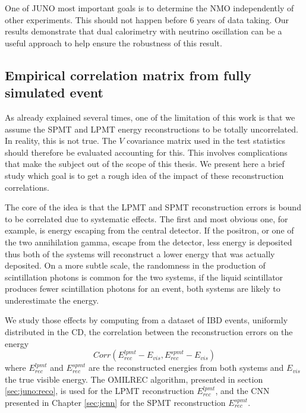 \documentclass[../main.tex]{subfiles}
\begin{document}
One of JUNO most important goals is to determine the NMO independently of other experiments. This should not happen before 6 years of data taking. Our results demonstrate that dual calorimetry with neutrino oscillation can be a useful approach to help ensure the robustness of this result.

\subsection{Empirical correlation matrix from fully simulated event}

As already explained several times, one of the limitation of this work is that we assume the SPMT and LPMT energy reconstructions to be totally uncorrelated. In reality, this is not true. The $V$ covariance matrix used in the test statistics should therefore be evaluated accounting for this. This involves complications that make the subject out of the scope of this thesis. We present here a brief study which goal is to get a rough idea of the impact of these reconstruction correlations.

The core of the idea is that the LPMT and SPMT reconstruction errors is bound to be correlated due to systematic effects. The first and most obvious one, for example, is energy escaping from the central detector. If the positron, or one of the two annihilation gamma, escape from the detector, less energy is deposited thus both of the systems will reconstruct a lower energy that was actually deposited. On a more subtle scale, the randomness in the production of scintillation photons is common for the two systems, if the liquid scintillator produces fewer scintillation photons for an event, both systems are likely to underestimate the energy.

We study those effects by computing from a dataset of IBD events, uniformly distributed in the CD, the correlation between the reconstruction errors on the energy
\begin{equation}
  Corr(E^{lpmt}_{rec} - E_{vis}, E^{spmt}_{rec} - E_{vis})
\end{equation}
where $E^{lpmt}_{rec}$ and $E^{spmt}_{rec}$ are the reconstructed energies from both systems and $E_{vis}$ the true visible energy. The OMILREC algorithm, presented in section \ref{sec:juno:reco}, is used for the LPMT reconstruction $E^{lpmt}_{rec}$, and the CNN presented in Chapter \ref{sec:jcnn} for the SPMT reconstruction $E^{spmt}_{rec}$.

\end{document}
